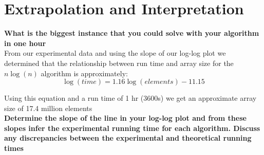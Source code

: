 \documentclass[a4paper,12pt]{article}
\begin{document}
\pagebreak
 

\section*{Extrapolation and Interpretation}

\textbf{What is the biggest instance that you could solve with your algorithm in one hour}\\

From our experimental data and using the slope of our log-log plot we determined that the relationship between run time and array size for the $n\log(n)$ algorithm is approximately: 
$$\log(time) = 1.16\log(elements)- 11.15$$

Using this equation and a run time of 1 hr (3600s) we get an approximate array size of 17.4 million elements \\


\textbf{Determine the slope of the line in your log-log plot and from these slopes infer the experimental running time for each algorithm. Discuss any discrepancies between the experimental and theoretical running times}\\
\end{document}
